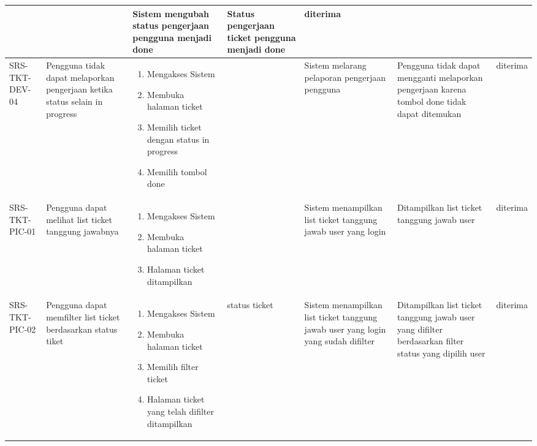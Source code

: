 \documentclass[12pt]{article}
\begin{document}
\begin{enumerate}[label=\textbf{5.\arabic*.}]
\begin{enumerate}[label=\textbf{5.2.\arabic*.}]
\begin{landscape}
\begin{longtable}{ |l|p{}|p{}|p{}|p{}|p{}|l| }
\begin{enumerate}[label=\arabic*.]
                \end{enumerate} 
                &  & Sistem mengubah status pengerjaan pengguna menjadi done & Status pengerjaan ticket pengguna menjadi done & diterima \\
                \hline
                SRS-TKT-DEV-04 & Pengguna tidak dapat melaporkan pengerjaan ketika status selain in progress &  
                \begin{enumerate}[label=\arabic*.] 
                    \item Mengakses Sistem
                    \item Membuka halaman ticket
                    \item Memilih ticket dengan status in progress
                    \item Memilih tombol done
                \end{enumerate} 
                &  & Sistem melarang pelaporan pengerjaan pengguna & Pengguna tidak dapat mengganti melaporkan pengerjaan karena tombol done tidak dapat ditemukan & diterima \\
                \hline
                SRS-TKT-PIC-01 & Pengguna dapat melihat list ticket tanggung jawabnya & 
                \begin{enumerate}[label=\arabic*.] 
                    \item Mengakses Sistem
                    \item Membuka halaman ticket
                    \item Halaman ticket ditampilkan
                \end{enumerate} 
                &  & Sistem menampilkan list ticket tanggung jawab user yang login & Ditampilkan list ticket tanggung jawab user & diterima \\
                \hline
                SRS-TKT-PIC-02 & Pengguna dapat memfilter list ticket berdasarkan status tiket & 
                \begin{enumerate}[label=\arabic*.] 
                    \item Mengakses Sistem
                    \item Membuka halaman ticket
                    \item Memilih filter ticket
                    \item Halaman ticket yang telah difilter ditampilkan
                \end{enumerate} 
                & status ticket & Sistem menampilkan list ticket tanggung jawab user yang login yang sudah difilter & Ditampilkan list ticket tanggung jawab user yang difilter berdasarkan filter status yang dipilih user& diterima \\

\end{longtable}
\end{landscape}
\end{enumerate}
\end{enumerate}
\end{document}
